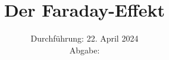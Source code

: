 

\subject{\texorpdfstring{\vspace{2ex}}{}V46\texorpdfstring{\vspace{-2ex}}{}} %
\title{Der Faraday-Effekt} %
\date{
	Durchführung: 22. April 2024 %
	\\ Abgabe:  %
}




\maketitle
\thispagestyle{empty}


\tableofcontents
\newpage








\enlargethispage{2\baselineskip}\printbibliography{}\pagebreak

\newpage




